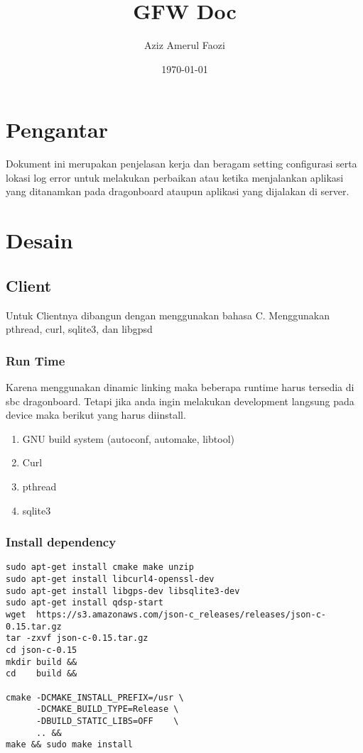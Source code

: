\documentclass[11pt]{article}
\author{Aziz Amerul Faozi}
\date{\today}
\title{GFW Doc}
\begin{document}
\maketitle
\tableofcontents


\section{Pengantar}
\label{sec:orgcb7f619}
Dokument ini merupakan penjelasan kerja dan beragam setting configurasi serta 
lokasi log error untuk melakukan perbaikan atau ketika menjalankan aplikasi
yang ditanamkan pada dragonboard ataupun aplikasi yang dijalakan di server.
\section{Desain}
\label{sec:orgfdb7b7a}
\subsection{Client}
\label{sec:org935fa69}
Untuk Clientnya dibangun dengan menggunakan bahasa C. Menggunakan pthread, curl, sqlite3,
dan libgpsd
\subsubsection{Run Time}
\label{sec:orgbc08caa}
Karena menggunakan dinamic linking maka beberapa runtime harus tersedia di sbc dragonboard.
Tetapi jika anda ingin melakukan development langsung pada device maka berikut  yang harus 
diinstall.

\begin{enumerate}
\item GNU build system (autoconf, automake, libtool)
\item Curl
\item pthread
\item sqlite3
\end{enumerate}
\subsubsection{Install dependency}
\label{sec:org8404cb3}
\begin{verbatim}
sudo apt-get install cmake make unzip
sudo apt-get install libcurl4-openssl-dev
sudo apt-get install libgps-dev libsqlite3-dev
sudo apt-get install qdsp-start
wget  https://s3.amazonaws.com/json-c_releases/releases/json-c-0.15.tar.gz
tar -zxvf json-c-0.15.tar.gz
cd json-c-0.15
mkdir build &&
cd    build &&

cmake -DCMAKE_INSTALL_PREFIX=/usr \
      -DCMAKE_BUILD_TYPE=Release \
      -DBUILD_STATIC_LIBS=OFF    \
      .. &&
make && sudo make install
\end{verbatim}
\end{document}
